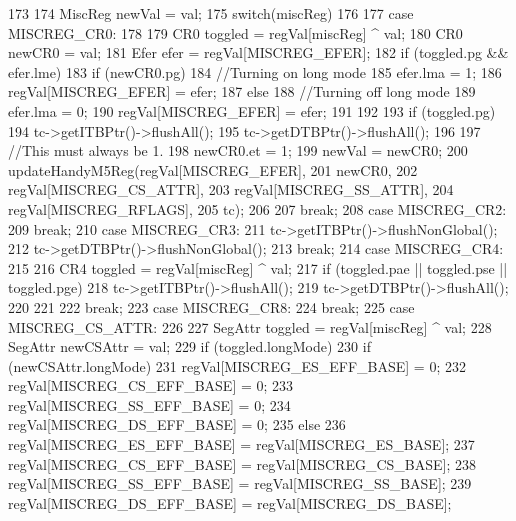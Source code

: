 \begin{DoxyCode}
173 {
174     MiscReg newVal = val;
175     switch(miscReg)
176     {
177       case MISCREG_CR0:
178         {
179             CR0 toggled = regVal[miscReg] ^ val;
180             CR0 newCR0 = val;
181             Efer efer = regVal[MISCREG_EFER];
182             if (toggled.pg && efer.lme) {
183                 if (newCR0.pg) {
184                     //Turning on long mode
185                     efer.lma = 1;
186                     regVal[MISCREG_EFER] = efer;
187                 } else {
188                     //Turning off long mode
189                     efer.lma = 0;
190                     regVal[MISCREG_EFER] = efer;
191                 }
192             }
193             if (toggled.pg) {
194                 tc->getITBPtr()->flushAll();
195                 tc->getDTBPtr()->flushAll();
196             }
197             //This must always be 1.
198             newCR0.et = 1;
199             newVal = newCR0;
200             updateHandyM5Reg(regVal[MISCREG_EFER],
201                              newCR0,
202                              regVal[MISCREG_CS_ATTR],
203                              regVal[MISCREG_SS_ATTR],
204                              regVal[MISCREG_RFLAGS],
205                              tc);
206         }
207         break;
208       case MISCREG_CR2:
209         break;
210       case MISCREG_CR3:
211         tc->getITBPtr()->flushNonGlobal();
212         tc->getDTBPtr()->flushNonGlobal();
213         break;
214       case MISCREG_CR4:
215         {
216             CR4 toggled = regVal[miscReg] ^ val;
217             if (toggled.pae || toggled.pse || toggled.pge) {
218                 tc->getITBPtr()->flushAll();
219                 tc->getDTBPtr()->flushAll();
220             }
221         }
222         break;
223       case MISCREG_CR8:
224         break;
225       case MISCREG_CS_ATTR:
226         {
227             SegAttr toggled = regVal[miscReg] ^ val;
228             SegAttr newCSAttr = val;
229             if (toggled.longMode) {
230                 if (newCSAttr.longMode) {
231                     regVal[MISCREG_ES_EFF_BASE] = 0;
232                     regVal[MISCREG_CS_EFF_BASE] = 0;
233                     regVal[MISCREG_SS_EFF_BASE] = 0;
234                     regVal[MISCREG_DS_EFF_BASE] = 0;
235                 } else {
236                     regVal[MISCREG_ES_EFF_BASE] = regVal[MISCREG_ES_BASE];
237                     regVal[MISCREG_CS_EFF_BASE] = regVal[MISCREG_CS_BASE];
238                     regVal[MISCREG_SS_EFF_BASE] = regVal[MISCREG_SS_BASE];
239                     regVal[MISCREG_DS_EFF_BASE] = regVal[MISCREG_DS_BASE];
}}}}}
\end{DoxyCode}
